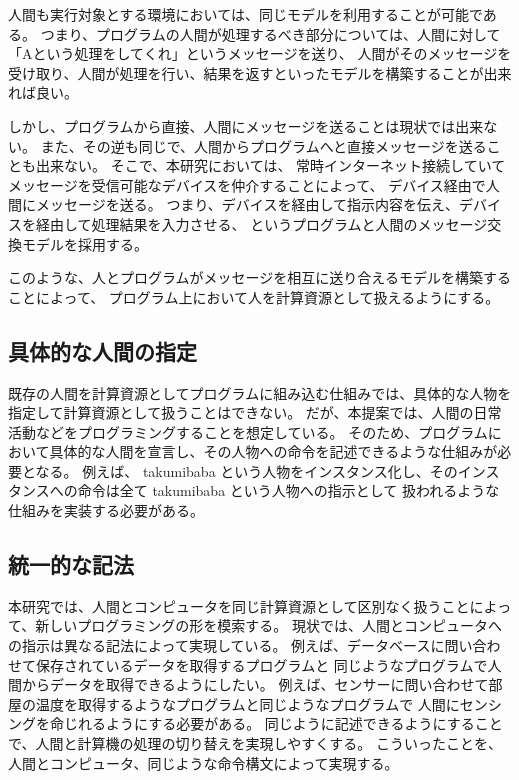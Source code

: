 人間も実行対象とする環境においては、同じモデルを利用することが可能である。
つまり、プログラムの人間が処理するべき部分については、人間に対して「Aという処理をしてくれ」というメッセージを送り、
人間がそのメッセージを受け取り、人間が処理を行い、結果を返すといったモデルを構築することが出来れば良い。

しかし、プログラムから直接、人間にメッセージを送ることは現状では出来ない。
また、その逆も同じで、人間からプログラムへと直接メッセージを送ることも出来ない。
そこで、本研究においては、
常時インターネット接続していてメッセージを受信可能なデバイスを仲介することによって、
デバイス経由で人間にメッセージを送る。
つまり、デバイスを経由して指示内容を伝え、デバイスを経由して処理結果を入力させる、
というプログラムと人間のメッセージ交換モデルを採用する。

このような、人とプログラムがメッセージを相互に送り合えるモデルを構築することによって、
プログラム上において人を計算資源として扱えるようにする。

\subsection{具体的な人間の指定}\label{ux5177ux4f53ux7684ux306aux4ebaux9593ux306eux6307ux5b9a}

既存の人間を計算資源としてプログラムに組み込む仕組みでは、具体的な人物を指定して計算資源として扱うことはできない。
だが、本提案では、人間の日常活動などをプログラミングすることを想定している。
そのため、プログラムにおいて具体的な人間を宣言し、その人物への命令を記述できるような仕組みが必要となる。
例えば、 takumibaba
という人物をインスタンス化し、そのインスタンスへの命令は全て takumibaba
という人物への指示として 扱われるような仕組みを実装する必要がある。

\subsection{統一的な記法}\label{ux7d71ux4e00ux7684ux306aux8a18ux6cd5}

本研究では、人間とコンピュータを同じ計算資源として区別なく扱うことによって、新しいプログラミングの形を模索する。
現状では、人間とコンピュータへの指示は異なる記法によって実現している。
例えば、データベースに問い合わせて保存されているデータを取得するプログラムと
同じようなプログラムで人間からデータを取得できるようにしたい。
例えば、センサーに問い合わせて部屋の温度を取得するようなプログラムと同じようなプログラムで
人間にセンシングを命じれるようにする必要がある。
同じように記述できるようにすることで、人間と計算機の処理の切り替えを実現しやすくする。
こういったことを、人間とコンピュータ、同じような命令構文によって実現する。

